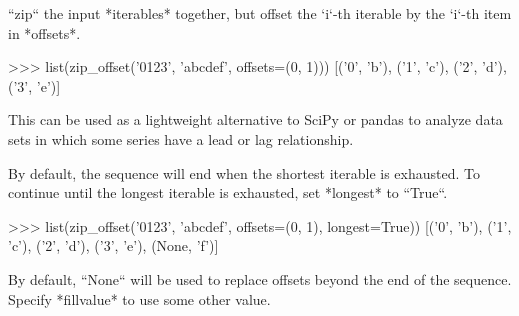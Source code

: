 \begin{DoxyVerb}``zip`` the input *iterables* together, but offset the `i`-th iterable
by the `i`-th item in *offsets*.

    >>> list(zip_offset('0123', 'abcdef', offsets=(0, 1)))
    [('0', 'b'), ('1', 'c'), ('2', 'd'), ('3', 'e')]

This can be used as a lightweight alternative to SciPy or pandas to analyze
data sets in which some series have a lead or lag relationship.

By default, the sequence will end when the shortest iterable is exhausted.
To continue until the longest iterable is exhausted, set *longest* to
``True``.

    >>> list(zip_offset('0123', 'abcdef', offsets=(0, 1), longest=True))
    [('0', 'b'), ('1', 'c'), ('2', 'd'), ('3', 'e'), (None, 'f')]

By default, ``None`` will be used to replace offsets beyond the end of the
sequence. Specify *fillvalue* to use some other value.\end{DoxyVerb}
 